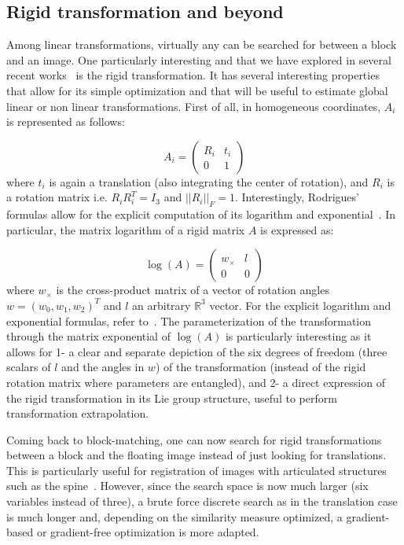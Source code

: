\documentclass[a4paper]{article}
\begin{document}
\subsection{Rigid transformation and beyond}

Among linear transformations, virtually any can be searched for between a block and an image. One particularly interesting and that we have explored in several recent works~\cite{commowick:inserm-00681610,Commowick_Miccai_2012} is the rigid transformation. It has several interesting properties that allow for its simple optimization and that will be useful to estimate global linear or non linear transformations. First of all, in homogeneous coordinates, $A_i$ is represented as follows:

\begin{equation}
	A_i = \begin{pmatrix} R_i & t_i \\ 0 & 1 \end{pmatrix}
\end{equation}
where $t_i$ is again a translation (also integrating the center of rotation), and $R_i$ is a rotation matrix i.e. $R_i R_i^T = I_3$ and $|| R_i ||_F = 1$. Interestingly, Rodrigues' formulas allow for the explicit computation of its logarithm and exponential~\cite{blanco2010tutorial}. In particular, the matrix logarithm of a rigid matrix $A$ is expressed as:

\begin{equation}
	\log(A) = \begin{pmatrix} w_{\times} & l \\ 0 & 0 \end{pmatrix}
\end{equation}
where $w_{\times}$ is the cross-product matrix of a vector of rotation angles $w = (w_0,w_1,w_2)^T$ and $l$ an arbitrary $\mathbb{R}^3$ vector. For the explicit logarithm and exponential formulas, refer to~\cite{blanco2010tutorial}. The parameterization of the transformation through the matrix exponential of $\log(A)$ is particularly interesting as it allows for 1- a clear and separate depiction of the six degrees of freedom (three scalars of $l$ and the angles in $w$) of the transformation (instead of the rigid rotation matrix where parameters are entangled), and 2- a direct expression of the rigid transformation in its Lie group structure, useful to perform transformation extrapolation.

Coming back to block-matching, one can now search for rigid transformations between a block and the floating image instead of just looking for translations. This is particularly useful for registration of images with articulated structures such as the spine~\cite{Commowick_Miccai_2012}. However, since the search space is now much larger (six variables instead of three), a brute force discrete search as in the translation case is much longer and, depending on the similarity measure optimized, a gradient-based or gradient-free optimization is more adapted.
\end{document}
